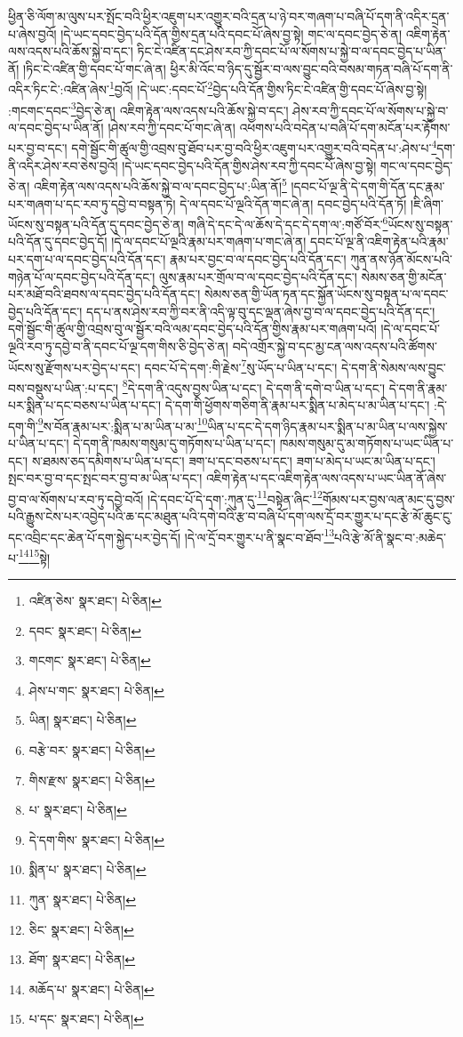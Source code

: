ཕྱིན་ཅི་ལོག་མ་ལུས་པར་སྤོང་བའི་ཕྱིར་འཇུག་པར་འགྱུར་བའི་དྲན་པ་ཉེ་བར་གཞག་པ་བཞི་པོ་དག་ནི་འདིར་དྲན་པ་ཞེས་བྱའོ། །དེ་ཡང་དབང་བྱེད་པའི་དོན་གྱིས་དྲན་པའི་དབང་པོ་ཞེས་བྱ་སྟེ། གང་ལ་དབང་བྱེད་ཅེ་ན། འཇིག་རྟེན་ལས་འདས་པའི་ཆོས་སྐྱེ་བ་དང་། ཏིང་ངེ་འཛིན་དང་ཤེས་རབ་ཀྱི་དབང་པོ་ལ་སོགས་པ་སྐྱེ་བ་ལ་དབང་བྱེད་པ་ཡིན་ནོ། །ཏིང་ངེ་འཛིན་གྱི་དབང་པོ་གང་ཞེ་ན། ཕྱིར་མི་འོང་བ་ཉིད་དུ་སྦྱོར་བ་ལས་བྱུང་བའི་བསམ་གཏན་བཞི་པོ་དག་ནི་འདིར་ཏིང་ངེ་:འཛིན་ཞེས་\footnote{འཛིན་ཅེས་  སྣར་ཐང་།  པེ་ཅིན། }བྱའོ། །དེ་ཡང་:དབང་པོ་\footnote{དབང་  སྣར་ཐང་།  པེ་ཅིན། }བྱེད་པའི་དོན་གྱིས་ཏིང་ངེ་འཛིན་གྱི་དབང་པོ་ཞེས་བྱ་སྟེ། :གངགང་དབང་\footnote{གངགང་  སྣར་ཐང་།  པེ་ཅིན། }བྱེད་ཅེ་ན། འཇིག་རྟེན་ལས་འདས་པའི་ཆོས་སྐྱེ་བ་དང་། ཤེས་རབ་ཀྱི་དབང་པོ་ལ་སོགས་པ་སྐྱེ་བ་ལ་དབང་བྱེད་པ་ཡིན་ནོ། །ཤེས་རབ་ཀྱི་དབང་པོ་གང་ཞེ་ན། འཕགས་པའི་བདེན་པ་བཞི་པོ་དག་མངོན་པར་རྟོགས་པར་བྱ་བ་དང་། དགེ་སྦྱོང་གི་ཚུལ་གྱི་འབྲས་བུ་ཐོབ་པར་བྱ་བའི་ཕྱིར་འཇུག་པར་འགྱུར་བའི་བདེན་པ་:ཤེས་པ་\footnote{ཤེས་པ་གང་  སྣར་ཐང་།  པེ་ཅིན། }དག་ནི་འདིར་ཤེས་རབ་ཅེས་བྱའོ། །དེ་ཡང་དབང་བྱེད་པའི་དོན་གྱིས་ཤེས་རབ་ཀྱི་དབང་པོ་ཞེས་བྱ་སྟེ། གང་ལ་དབང་བྱེད་ཅེ་ན། འཇིག་རྟེན་ལས་འདས་པའི་ཆོས་སྐྱེ་བ་ལ་དབང་བྱེད་པ་:ཡིན་ནོ།\footnote{ཡིན།  སྣར་ཐང་།  པེ་ཅིན། } །དབང་པོ་ལྔ་ནི་དེ་དག་གི་དོན་དང་རྣམ་པར་གཞག་པ་དང་རབ་ཏུ་དབྱེ་བ་བསྟན་ཏེ། དེ་ལ་དབང་པོ་ལྔའི་དོན་གང་ཞེ་ན། དབང་བྱེད་པའི་དོན་ཏོ། །ཇི་ཞིག་ཡོངས་སུ་བསྟན་པའི་དོན་དུ་དབང་བྱེད་ཅེ་ན། གཞི་དེ་དང་དེ་ལ་ཆོས་དེ་དང་དེ་དག་ལ་:གཙོ་བོར་\footnote{བརྩེ་བར་  སྣར་ཐང་།  པེ་ཅིན། }ཡོངས་སུ་བསྟན་པའི་དོན་དུ་དབང་བྱེད་དོ། །དེ་ལ་དབང་པོ་ལྔའི་རྣམ་པར་གཞག་པ་གང་ཞེ་ན། དབང་པོ་ལྔ་ནི་འཇིག་རྟེན་པའི་རྣམ་པར་དག་པ་ལ་དབང་བྱེད་པའི་དོན་དང་། རྣམ་པར་བྱང་བ་ལ་དབང་བྱེད་པའི་དོན་དང་། ཀུན་ནས་ཉོན་མོངས་པའི་གཉེན་པོ་ལ་དབང་བྱེད་པའི་དོན་དང་། ལུས་རྣམ་པར་གྲོལ་བ་ལ་དབང་བྱེད་པའི་དོན་དང་། སེམས་ཅན་གྱི་མངོན་པར་མཐོ་བའི་ཐབས་ལ་དབང་བྱེད་པའི་དོན་དང་། སེམས་ཅན་གྱི་ཡོན་ཏན་དང་སྐྱོན་ཡོངས་སུ་བསྟན་པ་ལ་དབང་བྱེད་པའི་དོན་དང་། དད་པ་ནས་ཤེས་རབ་ཀྱི་བར་ནི་འདི་ལྟ་བུ་དང་ལྡན་ཞེས་བྱ་བ་ལ་དབང་བྱེད་པའི་དོན་དང་། དགེ་སྦྱོང་གི་ཚུལ་གྱི་འབྲས་བུ་ལ་སྦྱོར་བའི་ལམ་དབང་བྱེད་པའི་དོན་གྱིས་རྣམ་པར་གཞག་པའོ། །དེ་ལ་དབང་པོ་ལྔའི་རབ་ཏུ་དབྱེ་བ་ནི་དབང་པོ་ལྔ་དག་གིས་ཅི་བྱེད་ཅེ་ན། བདེ་འགྲོར་སྐྱེ་བ་དང་མྱ་ངན་ལས་འདས་པའི་ཚོགས་ཡོངས་སུ་རྫོགས་པར་བྱེད་པ་དང་། དབང་པོ་དེ་དག་:གི་རྗེས་\footnote{གིས་རྫས་  སྣར་ཐང་།  པེ་ཅིན། }སུ་ཡོད་པ་ཡིན་པ་དང་། དེ་དག་ནི་སེམས་ལས་བྱུང་བས་བསྡུས་པ་ཡིན་:པ་དང་། \footnote{པ་  སྣར་ཐང་།  པེ་ཅིན། }དེ་དག་ནི་འདུས་བྱས་ཡིན་པ་དང་། དེ་དག་ནི་དགེ་བ་ཡིན་པ་དང་། དེ་དག་ནི་རྣམ་པར་སྨིན་པ་དང་བཅས་པ་ཡིན་པ་དང་། དེ་དག་གི་ཕྱོགས་གཅིག་ནི་རྣམ་པར་སྨིན་པ་མེད་པ་མ་ཡིན་པ་དང་། :དེ་དག་གི་\footnote{དེ་དག་གིས་  སྣར་ཐང་།  པེ་ཅིན། }ས་བོན་རྣམ་པར་:སྨིན་པ་མ་ཡིན་པ་མ་\footnote{སྨིན་པ་  སྣར་ཐང་།  པེ་ཅིན། }ཡིན་པ་དང་དེ་དག་ཉིད་རྣམ་པར་སྨིན་པ་མ་ཡིན་པ་ལས་སྐྱེས་པ་ཡིན་པ་དང་། དེ་དག་ནི་ཁམས་གསུམ་དུ་གཏོགས་པ་ཡིན་པ་དང་། ཁམས་གསུམ་དུ་མ་གཏོགས་པ་ཡང་ཡིན་པ་དང་། ས་ཐམས་ཅད་དམིགས་པ་ཡིན་པ་དང་། ཟག་པ་དང་བཅས་པ་དང་། ཟག་པ་མེད་པ་ཡང་མ་ཡིན་པ་དང་། སྤང་བར་བྱ་བ་དང་སྤང་བར་བྱ་བ་མ་ཡིན་པ་དང་། འཇིག་རྟེན་པ་དང་འཇིག་རྟེན་ལས་འདས་པ་ཡང་ཡིན་ནོ་ཞེས་བྱ་བ་ལ་སོགས་པ་རབ་ཏུ་དབྱེ་བའོ། །དེ་དབང་པོ་དེ་དག་:ཀུན་དུ་\footnote{ཀུན་  སྣར་ཐང་།  པེ་ཅིན། }བསྟེན་ཞིང་\footnote{ཅིང་  སྣར་ཐང་།  པེ་ཅིན། }གོམས་པར་བྱས་ལན་མང་དུ་བྱས་པའི་རྒྱུས་ངེས་པར་འབྱེད་པའི་ཆ་དང་མཐུན་པའི་དགེ་བའི་རྩ་བ་བཞི་པོ་དག་ལས་དྲོ་བར་གྱུར་པ་དང་རྩེ་མོ་ཆུང་ངུ་དང་འབྲིང་དང་ཆེན་པོ་དག་སྐྱེད་པར་བྱེད་དོ། །དེ་ལ་དྲོ་བར་གྱུར་པ་ནི་སྣང་བ་ཐོབ་\footnote{ཐོག་  སྣར་ཐང་།  པེ་ཅིན། }པའི་རྩེ་མོ་ནི་སྣང་བ་:མཆེད་པ་\footnote{མཆོད་པ་  སྣར་ཐང་།  པེ་ཅིན། }\footnote{པ་དང་  སྣར་ཐང་།  པེ་ཅིན། }སྟེ། 